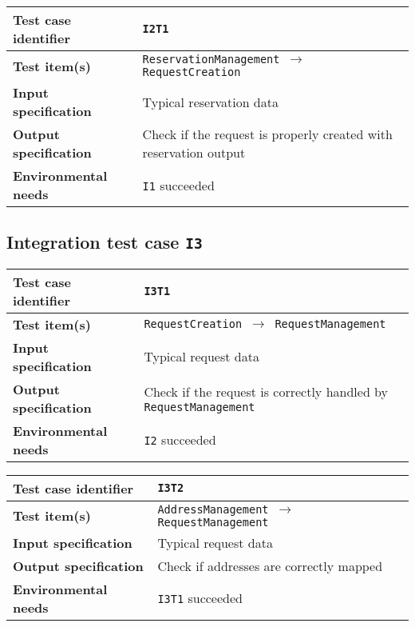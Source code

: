 \begin{table*}[!h]\centering\begin{tabularx}{.9\textwidth}{ >{\bfseries}l X }\toprule%
Test case identifier	&	\texttt{I2T1}	\\\midrule
Test item(s)		&	\texttt{ReservationManagement $\to$ RequestCreation}	\\\midrule
Input specification	&	Typical reservation data	\\\midrule
Output specification	&	Check if the request is properly created with reservation output	\\\midrule
Environmental needs	&	\texttt{I1} succeeded	\\
\bottomrule\end{tabularx}\end{table*}








\subsection{Integration test case \normalfont\texttt{I3}}\label{subsec:t3}

\begin{table*}[!h]\centering\begin{tabularx}{.9\textwidth}{ >{\bfseries}l X }\toprule%
Test case identifier	&	\texttt{I3T1}	\\\midrule
Test item(s)		&	\texttt{RequestCreation $\to$ RequestManagement}	\\\midrule
Input specification	&	Typical request data	\\\midrule
Output specification	&	Check if the request is correctly handled by \texttt{RequestManagement}	\\\midrule
Environmental needs	&	\texttt{I2} succeeded	\\
\bottomrule\end{tabularx}\end{table*}



\clearpage



\begin{table*}[!h]\centering\begin{tabularx}{.9\textwidth}{ >{\bfseries}l X }\toprule%
Test case identifier	&	\texttt{I3T2}	\\\midrule
Test item(s)		&	\texttt{AddressManagement $\to$ RequestManagement}	\\\midrule
Input specification	&	Typical request data	\\\midrule
Output specification	&	Check if addresses are correctly mapped	\\\midrule
Environmental needs	&	\texttt{I3T1} succeeded	\\
\bottomrule\end{tabularx}\end{table*}












